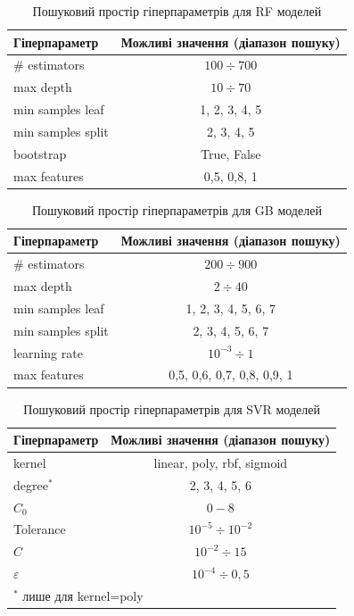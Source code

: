 \documentclass[14pt,a4paper,titlepage,oneside]{book}
\numberwithin{equation}{part}
\begin{document}
\begin{table}
\caption{Пошуковий простір гіперпараметрів для RF моделей }
\label{tblRFs}
\centering
\begin{tabular}{|l|c|}
\hline
Гіперпараметр&Можливі значення (діапазон пошуку)\\
\hline
\# estimators&	$100\div700$\\
\hline
max depth&	$10\div70$\\
\hline
min samples leaf &	1, 2, 3, 4, 5\\
\hline
min samples split	&2, 3, 4, 5\\
\hline
bootstrap	& True, False \\
\hline
max features &	0,5, 0,8, 1\\
\hline
\end{tabular}
\end{table}


\begin{table}[!ht]
\caption{Пошуковий простір гіперпараметрів для GB моделей }
\label{tblGBs}
\centering
\begin{tabular}{|l|c|}
\hline
Гіперпараметр&Можливі значення (діапазон пошуку)\\
\hline
\# estimators&	$200\div900$\\
\hline
max depth&	$2\div40$\\
\hline
min samples leaf &	1, 2, 3, 4, 5, 6, 7\\
\hline
min samples split	&2, 3, 4, 5, 6, 7\\
\hline
learning rate	& $10^{-3}\div1$ \\
\hline
max features &	0,5, 0,6, 0,7, 0,8, 0,9, 1\\
\hline
\end{tabular}
\end{table}

\begin{table}[!ht]
\caption{Пошуковий простір гіперпараметрів для SVR моделей }
\label{tblSVRs}
\centering
\begin{tabular}{|l|c|}
\hline
Гіперпараметр&Можливі значення (діапазон пошуку)\\
\hline
kernel &	linear, poly, rbf, sigmoid\\
\hline
degree$^*$&	2, 3, 4, 5, 6\\
\hline
$C_0$ &	$0-8$\\
\hline
Tolerance	&$10^{-5}\div10^{-2}$\\
\hline
$C$	& $10^{-2}\div15$ \\
\hline
$\varepsilon$ &	$10^{-4}\div0,5$\\
\hline
\multicolumn{2}{l}{$^*$ лише для kernel=poly}\\
\end{tabular}
\end{table}
\end{document}
